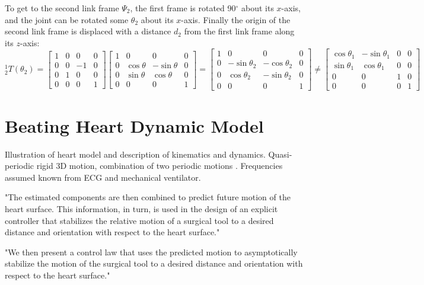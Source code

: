 To get to the second link frame $\Psi_2$, the first frame is rotated 90$^\circ$ about its $x$-axis, and the joint can be rotated some $\theta_2$ about its $x$-axis. Finally the origin of the second link frame is displaced with a distance $d_2$ from the first link frame along its $z$-axis:
\begin{equation}
^1_2 T(\theta_2) = 
\begin{bmatrix}
1 & 0 & 0 & 0\\
0 & 0 & -1 & 0\\
0 & 1 & 0 & 0\\
0 & 0 &  0 & 1
\end{bmatrix} 
\begin{bmatrix}
1 & 0 & 0 & 0\\
0 & \cos\theta & -\sin\theta & 0\\
0 & \sin\theta & \cos\theta & 0\\
 0 & 0 & 0 & 1
\end{bmatrix}  
=
\begin{bmatrix}
1 & 0 & 0 & 0\\
0 & -\sin\theta_2 & -\cos\theta_2 & 0\\
0 & \cos\theta_2 & -\sin\theta_2 & 0\\
0 & 0 &  0 & 1
\end{bmatrix}
\neq
\begin{bmatrix}
\cos\theta_1 & -\sin\theta_1 & 0 & 0\\
\sin\theta_1 & \cos\theta_1 & 0 & 0\\
0 & 0 & 1 & 0\\
0& 0& 0& 1
\end{bmatrix}
\end{equation}

\section{Beating Heart Dynamic Model}
Illustration of heart model and description of kinematics and dynamics.
Quasi-periodic rigid 3D motion, combination of two periodic motions \cite{bib:heart_berkeley}. Frequencies assumed known from ECG and mechanical ventilator.

"The estimated components are then combined to predict future motion of the heart surface. This information, in turn, is used in the design of an explicit controller that stabilizes the relative motion of a surgical tool to a desired distance and orientation with respect to the heart surface."

"We then present a control law that uses the predicted motion to asymptotically stabilize the motion of the surgical tool to a desired distance and orientation with respect to the heart surface."

